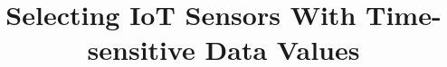 \documentclass[conference]{IEEEtran}
\begin{document}
%
\title{Selecting IoT Sensors With Time-sensitive Data Values}




% 
\end{document}
